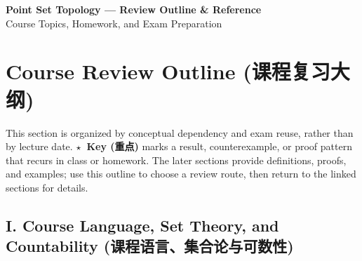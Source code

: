 \documentclass{article}
\newcommand{\reviewkey}{\textcolor{red!65!black}{\textbf{\ensuremath{\star}\ Key (重点)}}}
\begin{document}
\pagestyle{fancy}
\fancyhead{}
\rhead{\today}

\begin{center}
  {\Large\bfseries Point Set Topology --- Review Outline \& Reference}\\[6pt]
  {\large Course Topics, Homework, and Exam Preparation}
\end{center}
\vspace{6pt}

\tableofcontents
\newpage

\section*{Course Review Outline (课程复习大纲)}

\noindent This section is organized by conceptual dependency and exam reuse,
rather than by lecture date. \reviewkey{} marks a result, counterexample, or
proof pattern that recurs in class or homework. The later sections provide
definitions, proofs, and examples; use this outline to choose a review route,
then return to the linked sections for details.

\subsection*{I. Course Language, Set Theory, and Countability
(课程语言、集合论与可数性)}
\end{document}

